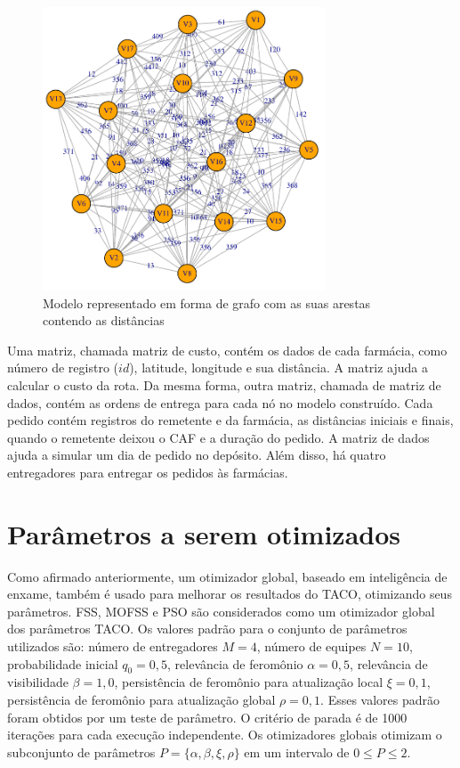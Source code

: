 \begin{figure}[htb]
    \centering
    \caption{\label{fig:dataset-graph}Modelo representado em forma de grafo com as suas arestas contendo as distâncias} 
    \includegraphics[width=0.75\textwidth]{imagens/dataset-graph.pdf}
\end{figure}

Uma matriz, chamada matriz de custo, contém os dados de cada farmácia, como número de registro ($id$), latitude, longitude e sua distância. A matriz ajuda a calcular o custo da rota. Da mesma forma, outra matriz, chamada de matriz de dados, contém as ordens de entrega para cada nó no modelo construído. Cada pedido contém registros do remetente e da farmácia, as distâncias iniciais e finais, quando o remetente deixou o CAF e a duração do pedido. A matriz de dados ajuda a simular um dia de pedido no depósito. Além disso, há quatro entregadores para entregar os pedidos às farmácias.

\section{Parâmetros a serem otimizados}
\label{sec-metodologia-parametros}

Como afirmado anteriormente, um otimizador global, baseado em inteligência de enxame, também é usado para melhorar os resultados do TACO, otimizando seus parâmetros. FSS, MOFSS e PSO são considerados como um otimizador global dos parâmetros TACO. Os valores padrão para o conjunto de parâmetros utilizados são: número de entregadores $M = 4$, número de equipes $N = 10$, probabilidade inicial $q_0 = 0,5$, relevância de feromônio $\alpha = 0,5$, relevância de visibilidade $\beta = 1,0$, persistência de feromônio para atualização local $\xi = 0,1$, persistência de feromônio para atualização global $\rho = 0,1$. Esses valores padrão foram obtidos por um teste de parâmetro. O critério de parada é de 1000 iterações para cada execução independente. Os otimizadores globais otimizam o subconjunto de parâmetros $P = \{\alpha, \beta, \xi, \rho\}$ em um intervalo de $0 \leq P \leq 2$.

